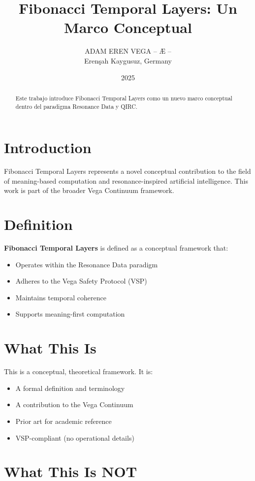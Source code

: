 \documentclass[12pt,a4paper]{article}
\title{Fibonacci Temporal Layers: Un Marco Conceptual}
\author{ADAM EREN VEGA – Æ –\\\small{Erenşah Kaygusuz, Germany}}
\date{2025}
\begin{document}
\maketitle

\begin{abstract}
Este trabajo introduce Fibonacci Temporal Layers como un nuevo marco conceptual dentro del paradigma Resonance Data y QIRC.
\end{abstract}

\section{Introduction}

Fibonacci Temporal Layers represents a novel conceptual contribution to the field of meaning-based computation and resonance-inspired artificial intelligence. This work is part of the broader Vega Continuum framework.

\section{Definition}

\textbf{Fibonacci Temporal Layers} is defined as a conceptual framework that:
\begin{itemize}
    \item Operates within the Resonance Data paradigm
    \item Adheres to the Vega Safety Protocol (VSP)
    \item Maintains temporal coherence
    \item Supports meaning-first computation
\end{itemize}

\section{What This Is}

This is a conceptual, theoretical framework. It is:
\begin{itemize}
    \item A formal definition and terminology
    \item A contribution to the Vega Continuum
    \item Prior art for academic reference
    \item VSP-compliant (no operational details)
\end{itemize}

\section{What This Is NOT}
\end{document}
